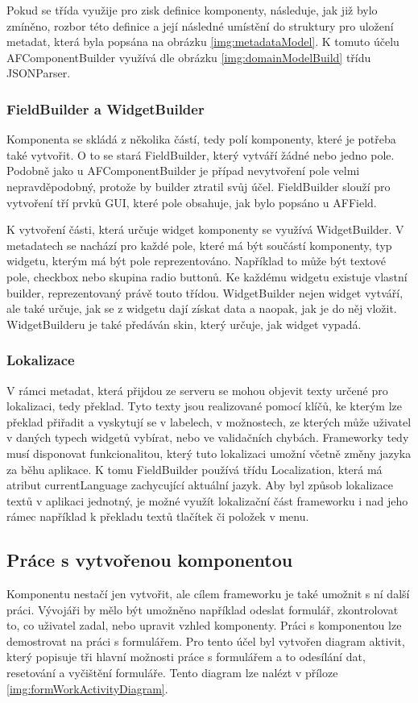 Pokud se třída využije pro zisk definice komponenty, následuje, jak již bylo zmíněno, rozbor této definice a její následné umístění do struktury pro uložení metadat, která byla popsána na obrázku \ref{img:metadataModel}. K tomuto účelu AFComponentBuilder využívá dle obrázku \ref{img:domainModelBuild} třídu JSONParser. 

\subsubsection{FieldBuilder a WidgetBuilder}
Komponenta se skládá z několika částí, tedy polí komponenty, které je potřeba také vytvořit. O to se stará FieldBuilder, který vytváří žádné nebo jedno pole. Podobně jako u AFComponentBuilder je případ nevytvoření pole velmi nepravděpodobný, protože by builder ztratil svůj účel. FieldBuilder slouží pro vytvoření tří prvků GUI, které pole obsahuje, jak bylo popsáno u AFField. 

K vytvoření části, která určuje widget komponenty se využívá WidgetBuilder. V metadatech se nachází pro každé pole, které má být součástí komponenty, typ widgetu, kterým má být pole reprezentováno. Například to může být textové pole, checkbox nebo skupina radio buttonů. Ke každému widgetu existuje vlastní builder, reprezentovaný právě touto třídou. WidgetBuilder nejen widget vytváří, ale také určuje, jak se z widgetu dají získat data a naopak, jak je do něj vložit. WidgetBuilderu je také předáván skin, který určuje, jak widget vypadá.

\subsubsection{Lokalizace}
V rámci metadat, která přijdou ze serveru se mohou objevit texty určené pro lokalizaci, tedy překlad. Tyto texty jsou realizované pomocí klíčů, ke kterým lze překlad přiřadit a vyskytují se v labelech, v možnostech, ze kterých může uživatel v daných typech widgetů vybírat, nebo ve validačních chybách. Frameworky tedy musí disponovat funkcionalitou, který tuto lokalizaci umožní včetně změny jazyka za běhu aplikace. K tomu FieldBuilder používá třídu Localization, která má atribut currentLanguage zachycující aktuální jazyk. Aby byl způsob lokalizace textů v aplikaci jednotný, je možné využít lokalizační část frameworku i nad jeho rámec například k překladu textů tlačítek či položek v menu. 

\subsection{Práce s vytvořenou komponentou}
Komponentu nestačí jen vytvořit, ale cílem frameworku je také umožnit s ní další práci. Vývojáři by mělo být umožněno například odeslat formulář, zkontrolovat to, co uživatel zadal, nebo upravit vzhled komponenty. Práci s komponentou lze demostrovat na práci s formulářem. Pro tento účel byl vytvořen diagram aktivit, který popisuje tři hlavní možnosti práce s formulářem a to odesílání dat, resetování a vyčištění formuláře. Tento diagram lze nalézt v příloze \ref{img:formWorkActivityDiagram}.


